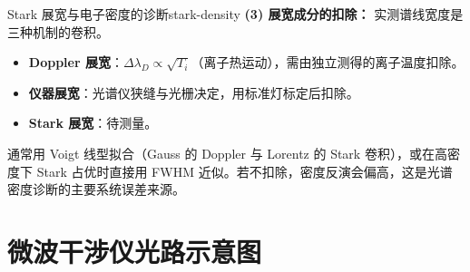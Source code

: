 \begin{example}{Stark 展宽与电子密度的诊断}{stark-density}
\textbf{(3) 展宽成分的扣除：} 实测谱线宽度是三种机制的卷积。
\begin{itemize}[leftmargin=*,itemsep=0pt]
\item \textbf{Doppler 展宽}：$\Delta\lambda_D \propto \sqrt{T_i}$（离子热运动），需由独立测得的离子温度扣除。
\item \textbf{仪器展宽}：光谱仪狭缝与光栅决定，用标准灯标定后扣除。
\item \textbf{Stark 展宽}：待测量。
\end{itemize}
通常用 Voigt 线型拟合（Gauss 的 Doppler 与 Lorentz 的 Stark 卷积），或在高密度下 Stark 占优时直接用 FWHM 近似。若不扣除，密度反演会偏高，这是光谱密度诊断的主要系统误差来源。
\end{example}

\section{微波干涉仪光路示意图}

